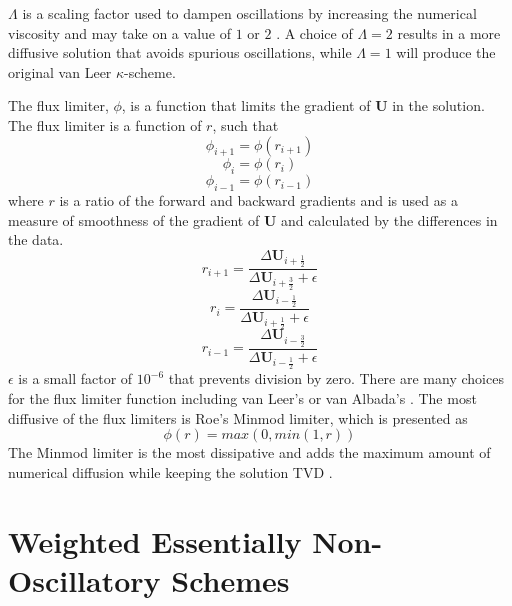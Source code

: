 $\Lambda$ is a scaling factor used to dampen oscillations by increasing the numerical viscosity and may take on a value of $1$ or $2$ \cite{BIDADI201465}. A choice of $\Lambda = 2$ results in a more diffusive solution that avoids spurious oscillations, while $\Lambda = 1$ will produce the original van Leer \cite{VANLEER1977263} $\kappa$-scheme. 

The flux limiter, $\phi$, is a function that limits the gradient of $\boldsymbol{U}$ in the solution. The flux limiter is a function of $r$, such that
\begin{equation}
	\phi_{i+1} = \phi\left(r_{i+1}\right)
\end{equation}
\begin{equation}
	\phi_{i} = \phi\left(r_{i}\right)
\end{equation}
\begin{equation}
	\phi_{i-1} = \phi\left(r_{i-1}\right)
\end{equation}
where $r$ is a ratio of the forward and backward gradients and is used as a measure of smoothness of the gradient of $\boldsymbol{U}$ and calculated by the differences in the data.
\begin{equation}\label{eqn:rip1}
	r_{i+1} = \frac{\Delta \boldsymbol{U}_{i+\frac{1}{2}}}{\Delta \boldsymbol{U}_{i+\frac{3}{2}} + \epsilon}
\end{equation}
\begin{equation}
	r_{i} = \frac{\Delta \boldsymbol{U}_{i-\frac{1}{2}}}{\Delta \boldsymbol{U}_{i+\frac{1}{2}} + \epsilon}
\end{equation}
\begin{equation}\label{eqn:rim1}
	r_{i-1} = \frac{\Delta \boldsymbol{U}_{i-\frac{3}{2}}}{\Delta \boldsymbol{U}_{i-\frac{1}{2}} + \epsilon}
\end{equation}
$\epsilon$ is a small factor of $10^{-6}$ that prevents division by zero. There are many choices for the flux limiter function including van Leer's \cite{VANLEER1997229} or van Albada's \cite{VANLEER199701}. The most diffusive of the flux limiters is Roe's \cite{ROESome} Minmod limiter, which is presented as
\begin{equation}
	\phi\left(r\right) = max\left(0,min\left(1,r\right)\right)
\end{equation}
The Minmod limiter is the most dissipative and adds the maximum amount of numerical diffusion while keeping the solution TVD \cite{BAI201868}.

\section{Weighted Essentially Non-Oscillatory Schemes}

